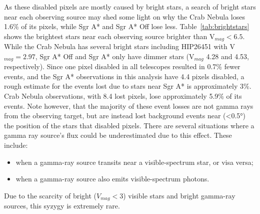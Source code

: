 As these disabled pixels are mostly caused by bright stars, a search of bright stars near each observing source may shed some light on why the Crab Nebula loses 1.6\% of its pixels, while Sgr A* and Sgr A* Off lose less.
Table~\ref{tab:brightstars} shows the brightest stars near each observing source brighter than V${}_{mag}<6.5$.
While the Crab Nebula has several bright stars including HIP26451 with V${}_{mag} = 2.97$, Sgr A* Off and Sgr A* only have dimmer stars (V${}_{mag}$ 4.28 and 4.53, respectively).
Since one pixel disabled in all telescopes resulted in 0.7\% fewer events, and the Sgr A* observations in this analysis have \nicetilde{}4.4 pixels disabled, a rough estimate for the events lost due to stars near Sgr A* is approximately 3\%.
Crab Nebula observations, with 8.4 lost pixels, lose approximately 5.9\% of its events.
Note however, that the majority of these event losses are not gamma rays from the observing target, but are instead lost background events near (<\ang{0.5}) the position of the stars that disabled pixels.
There are several situations where a gamma ray source's flux could be underestimated due to this effect.
These include:
\begin{itemize}[label=$\bullet$,noitemsep]
  \item when a gamma-ray source transits near a visible-spectrum star, or visa versa;
  \item when a gamma-ray source also emits visible-spectrum photons.
\end{itemize}
Due to the scarcity of bright ($V_{mag}<3$) visible stars and bright gamma-ray sources, this syzygy is extremely rare.

